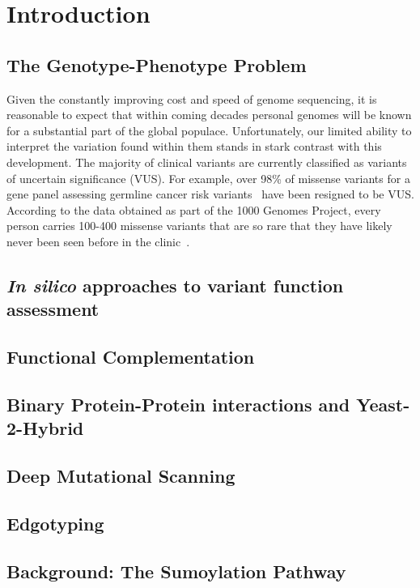
\chapter{Introduction}

\section{The Genotype-Phenotype Problem}

Given the constantly improving cost and speed of genome sequencing, it is reasonable to expect that within coming decades personal genomes will be known for a substantial part of the global populace. Unfortunately, our limited ability to interpret the variation found within them stands in stark contrast with this development. The majority of clinical variants  are currently classified as variants of uncertain significance (VUS). For example, over 98\% of missense variants for a gene panel assessing germline cancer risk variants~\cite{Maxwell2016} have been resigned to be VUS. 
According to the data obtained as part of the 1000 Genomes Project, every person carries 100-400 missense variants that are so rare that they have likely never been seen before in the clinic~\cite{1000genomes}. 

\section{\textit{In silico} approaches to variant function assessment}

\section{Functional Complementation}

\section{Binary Protein-Protein interactions and Yeast-2-Hybrid}

\section{Deep Mutational Scanning}

\section{Edgotyping}

\section{Background: The Sumoylation Pathway}